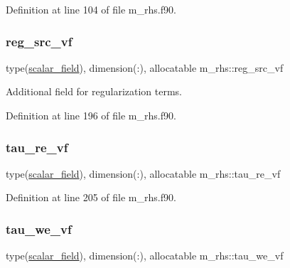 Definition at line 104 of file m\+\_\+rhs.\+f90.

\mbox{\label{namespacem__rhs_ae60a6ab812c015411331658e16e5ab77}} 
\subsubsection{\texorpdfstring{reg\+\_\+src\+\_\+vf}{reg\_src\_vf}}
{\footnotesize\ttfamily type(\hyperlink{structm__derived__types_1_1scalar__field}{scalar\+\_\+field}), dimension(\+:), allocatable m\+\_\+rhs\+::reg\+\_\+src\+\_\+vf}



Additional field for regularization terms. 



Definition at line 196 of file m\+\_\+rhs.\+f90.

\mbox{\label{namespacem__rhs_a7e3b4d8f32649ff607c52440009f903f}} 
\subsubsection{\texorpdfstring{tau\+\_\+re\+\_\+vf}{tau\_re\_vf}}
{\footnotesize\ttfamily type(\hyperlink{structm__derived__types_1_1scalar__field}{scalar\+\_\+field}), dimension(\+:), allocatable m\+\_\+rhs\+::tau\+\_\+re\+\_\+vf}



Definition at line 205 of file m\+\_\+rhs.\+f90.

\mbox{\label{namespacem__rhs_acc8e8d46f11ebb8f5c7389de8be28b60}} 
\subsubsection{\texorpdfstring{tau\+\_\+we\+\_\+vf}{tau\_we\_vf}}
{\footnotesize\ttfamily type(\hyperlink{structm__derived__types_1_1scalar__field}{scalar\+\_\+field}), dimension(\+:), allocatable m\+\_\+rhs\+::tau\+\_\+we\+\_\+vf}



